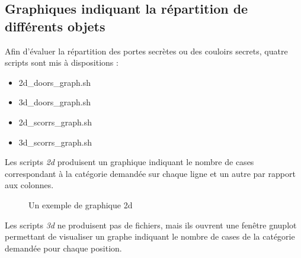 \documentclass[10pt,a4paper]{report}
\begin{document}
\subsection{Graphiques indiquant la répartition de différents objets}
Afin d'évaluer la répartition des portes secrètes ou des couloirs secrets,
quatre scripts sont mis à dispositions :

\begin{itemize}
\item 2d\_doors\_graph.sh
\item 3d\_doors\_graph.sh
\item 2d\_scorrs\_graph.sh
\item 3d\_scorrs\_graph.sh
\end{itemize}

Les scripts \emph{2d} produisent un graphique indiquant le nombre de cases
correspondant à la catégorie demandée sur chaque ligne et un autre par rapport
aux colonnes. 

\begin{figure}[H]
  \caption{\label{fig:2d_graph} Un exemple de graphique 2d}
\end{figure}


Les scripts \emph{3d} ne produisent pas de fichiers, mais ils ouvrent une
fenêtre gnuplot permettant de visualiser un graphe indiquant le nombre de cases
de la catégorie demandée pour chaque position. 
\end{document}
